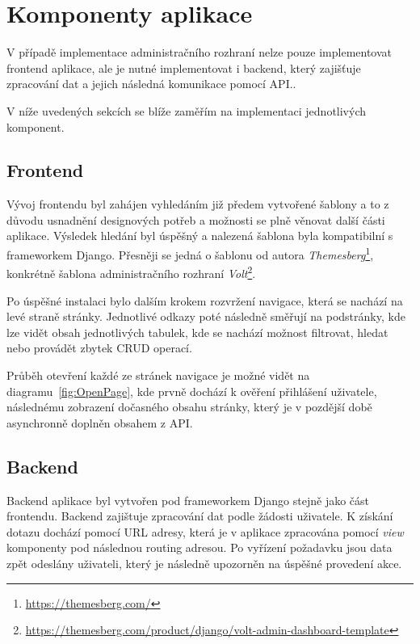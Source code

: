 \section{Komponenty aplikace}
\label{sec:implementation-components}
V případě implementace administračního rozhraní nelze pouze implementovat frontend aplikace, ale je nutné implementovat i backend, který zajišťuje zpracování dat a jejich následná komunikace pomocí API.\@.

V níže uvedených sekcích se blíže zaměřím na implementaci jednotlivých komponent.

\subsection{Frontend}
\label{subsec:implementation-frontend}
Vývoj frontendu byl zahájen vyhledáním již předem vytvořené šablony a to z důvodu usnadnění designových potřeb a možnosti se plně věnovat další části aplikace. Výsledek hledání byl úspěšný a nalezená šablona byla kompatibilní s frameworkem Django. Přesněji se jedná o šablonu od autora \textit{Themesberg}\footnote{\href{https://themesberg.com/}{https://themesberg.com/}}, konkrétně šablona administračního rozhraní \textit{Volt}\footnote{\href{https://themesberg.com/product/django/volt-admin-dashboard-template}{https://themesberg.com/product/django/volt-admin-dashboard-template}}.

Po úspěšné instalaci bylo dalším krokem rozvržení navigace, která se nachází na levé straně stránky. Jednotlivé odkazy poté následně směřují na podstránky, kde lze vidět obsah jednotlivých tabulek, kde se nachází možnost filtrovat, hledat nebo provádět zbytek CRUD operací.

Průběh otevření každé ze stránek navigace je možné vidět na diagramu~\ref{fig:OpenPage}, kde prvně dochází k ověření přihlášení uživatele, následnému zobrazení dočasného obsahu stránky, který je v pozdější době asynchronně doplněn obsahem z API\@.


\subsection{Backend}
\label{subsec:implementation-backend}
Backend aplikace byl vytvořen pod frameworkem Django stejně jako část frontendu. Backend  zajištuje zpracování dat podle žádosti uživatele. K získání dotazu dochází pomocí URL adresy, která je v aplikace zpracována pomocí \textit{view} komponenty pod následnou routing adresou. Po vyřízení požadavku jsou data zpět odeslány uživateli, který je následně upozorněn na úspěšné provedení akce.

